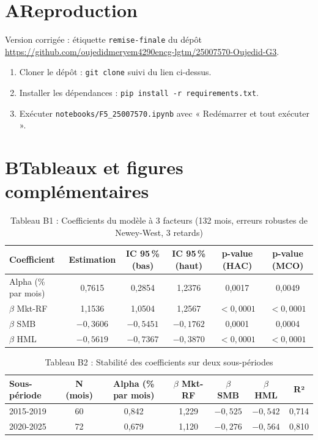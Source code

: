 \documentclass[11pt,a4paper]{article}
\newcommand{\mkt}{Mkt-RF}
\begin{document}
\appendix
\section*{A\quad Reproduction}
Version corrigée : étiquette \texttt{remise-finale} du dépôt \url{https://github.com/oujedidmeryem4290encg-lgtm/25007570-Oujedid-G3}.
\begin{enumerate}[leftmargin=1.2cm]
\item Cloner le dépôt : \texttt{git clone} suivi du lien ci-dessus.
\item Installer les dépendances : \texttt{pip install -r requirements.txt}.
\item Exécuter \texttt{notebooks/F5\_25007570.ipynb} avec « Redémarrer et tout exécuter ».
\end{enumerate}

\section*{B\quad Tableaux et figures complémentaires}

\begin{table}[H]
\centering
\caption*{Tableau B1 : Coefficients du modèle à 3 facteurs (132 mois, erreurs robustes de Newey-West, 3 retards)}
\small
\begin{tabular}{|l|c|c|c|c|c|}
\hline
\textbf{Coefficient} & \textbf{Estimation} & \textbf{IC 95\,\% (bas)} & \textbf{IC 95\,\% (haut)} & \textbf{p-value (HAC)} & \textbf{p-value (MCO)}\\\hline
Alpha (\% par mois) & 0,7615 & 0,2854 & 1,2376 & 0,0017 & 0,0049\\\hline
$\beta$ \mkt & 1,1536 & 1,0504 & 1,2567 & $<0{,}0001$ & $<0{,}0001$\\\hline
$\beta$ SMB & $-0{,}3606$ & $-0{,}5451$ & $-0{,}1762$ & 0,0001 & 0,0004\\\hline
$\beta$ HML & $-0{,}5619$ & $-0{,}7367$ & $-0{,}3870$ & $<0{,}0001$ & $<0{,}0001$\\\hline
\end{tabular}
\end{table}

\begin{table}[H]
\centering
\caption*{Tableau B2 : Stabilité des coefficients sur deux sous-périodes}
\small
\begin{tabular}{|l|c|c|c|c|c|c|}
\hline
\textbf{Sous-période} & \textbf{N (mois)} & \textbf{Alpha (\% par mois)} & \textbf{$\beta$ \mkt} & \textbf{$\beta$ SMB} & \textbf{$\beta$ HML} & \textbf{R²}\\\hline
2015-2019 & 60 & 0,842 & 1,229 & $-0{,}525$ & $-0{,}542$ & 0,714\\\hline
2020-2025 & 72 & 0,679 & 1,120 & $-0{,}276$ & $-0{,}564$ & 0,810\\\hline
\end{tabular}
\end{table}
\end{document}
